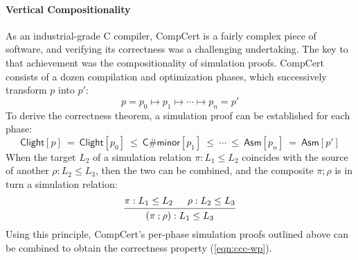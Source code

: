 \documentclass[acmsmall,screen,review,anonymous]{acmart}
\newcommand{\kw}[1]{\ensuremath{ \mathsf{#1} }}
\begin{document}
\paragraph{Vertical Compositionality}

As an industrial-grade C compiler,
CompCert is a fairly complex piece of software,
and verifying its correctness was a challenging undertaking.
The key to that achievement was the compositionality of simulation proofs.
CompCert consists of a dozen compilation and optimization phases,
which successively transform $p$ into $p'$:
\[
  p = p_0 \longmapsto p_1 \longmapsto \cdots \longmapsto p_n = p'
\]
To derive the correctness theorem,
a simulation proof can be established for each phase:
\[
  \kw{Clight}[p] \:=\:
  \kw{Clight}[p_0] \:\le\: \kw{C\#minor}[p_1] \:\le\: \cdots \:\le\: \kw{Asm}[p_n]
  \:=\: \kw{Asm}[p']
\]
When the target $L_2$ of a simulation relation $\pi : L_1 \le L_2$
coincides with the source of another $\rho : L_2 \le L_3$,
then the two can be combined, and the composite $\pi \mathbin; \rho$
is in turn a simulation relation:
\[
  \begin{prooftree}
    \hypo{\pi : L_1 \le L_2}
    \hypo{\rho : L_2 \le L_3}
    \infer2{(\pi \mathbin; \rho) : L_1 \le L_3}
  \end{prooftree}
\]
Using this principle,
CompCert's per-phase simulation proofs outlined above
can be combined to obtain the correctness property (\ref{eqn:ccc-wp}).

\end{document}

